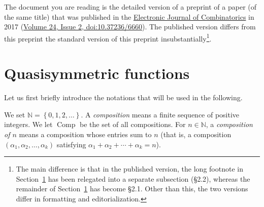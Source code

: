 \documentclass[numbers=enddot,12pt,final,onecolumn,notitlepage,abstracton]{scrartcl}
\theoremstyle{definition}
\newenvironment{verlong}{}{}
\newenvironment{vershort}{}{}
\newcommand{\Comp}{{\operatorname{Comp}}}
\newcommand{\NN}{{\mathbb{N}}}
\begin{document}
The document you are reading is the
\begin{verlong}
detailed version of a
\end{verlong}
preprint of a paper (of the
same title) that was
published in the
\href{http://www.combinatorics.org/}{Electronic Journal of
Combinatorics}
in 2017
(\href{https://doi.org/10.37236/6660}{Volume 24, Issue 2,
doi:10.37236/6660}).
The published version differs from
\begin{vershort}
this preprint
\end{vershort}
\begin{verlong}
the standard version of this preprint
\end{verlong}
insubstantially\footnote{The main difference is that in the
published version, the long footnote in
Section~\ref{sect.qsym-intro} has been relegated into a
separate subsection (\S 2.2), whereas the remainder of
Section~\ref{sect.qsym-intro} has become \S 2.1.
Other than this, the two versions differ in formatting and
editorialization.}.

\section{Quasisymmetric functions}
\label{sect.qsym-intro}

Let us first briefly introduce the notations that will be used in the
following.

We set $\NN = \left\{0, 1, 2, \ldots\right\}$. A \textit{composition}
means a finite sequence of positive integers. We let $\Comp$ be the set
of all compositions. For $n \in \NN$, a \textit{composition of $n$}
means a composition whose entries sum to $n$ (that is, a composition
$\left(\alpha_1, \alpha_2, \ldots, \alpha_k\right)$ satisfying
$\alpha_1 + \alpha_2 + \cdots + \alpha_k = n$).
\end{document}
